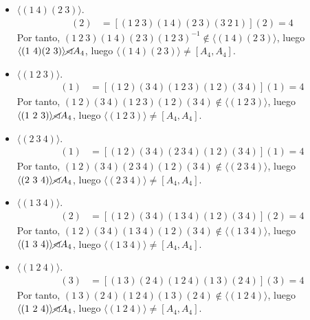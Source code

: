 \begin{ejercicio}
\begin{enumerate}
\begin{enumerate}
\begin{itemize}
                \item $\langle (1\ 4)(2\ 3)\rangle$.
                \begin{align*}
                    [(1\ 2\ 3)(1\ 4)(2\ 3)(1\ 2\ 3)^{-1}](2) &= [(1\ 2\ 3)(1\ 4)(2\ 3)(3\ 2\ 1)](2) = 4
                \end{align*}
                Por tanto, $(1\ 2\ 3)(1\ 4)(2\ 3)(1\ 2\ 3)^{-1}\notin \langle (1\ 4)(2\ 3)\rangle$, luego $\langle (1\ 4)(2\ 3)\rangle \cancel{\lhd} A_4$, luego $\langle (1\ 4)(2\ 3)\rangle \neq [A_4,A_4]$.

                \item $\langle (1\ 2\ 3)\rangle$.
                \begin{align*}
                    [(1\ 2)(3\ 4)(1\ 2\ 3)(1\ 2)^{-1}(3\ 4)^{-1}](1) &= [(1\ 2)(3\ 4)(1\ 2\ 3)(1\ 2)(3\ 4)](1) = 4
                \end{align*}
                Por tanto, $(1\ 2)(3\ 4)(1\ 2\ 3)(1\ 2)(3\ 4)\notin \langle (1\ 2\ 3)\rangle$, luego $\langle (1\ 2\ 3)\rangle \cancel{\lhd} A_4$, luego $\langle (1\ 2\ 3)\rangle \neq [A_4,A_4]$.

                \item $\langle (2\ 3\ 4)\rangle$.
                \begin{align*}
                    [(1\ 2)(3\ 4)(2\ 3\ 4)(1\ 2)^{-1}(3\ 4)^{-1}](1) &= [(1\ 2)(3\ 4)(2\ 3\ 4)(1\ 2)(3\ 4)](1) = 4
                \end{align*}
                Por tanto, $(1\ 2)(3\ 4)(2\ 3\ 4)(1\ 2)(3\ 4)\notin \langle (2\ 3\ 4)\rangle$, luego $\langle (2\ 3\ 4)\rangle \cancel{\lhd} A_4$, luego $\langle (2\ 3\ 4)\rangle \neq [A_4,A_4]$.

                \item $\langle (1\ 3\ 4)\rangle$.
                \begin{align*}
                    [(1\ 2)(3\ 4)(1\ 3\ 4)(1\ 2)^{-1}(3\ 4)^{-1}](2) &= [(1\ 2)(3\ 4)(1\ 3\ 4)(1\ 2)(3\ 4)](2) = 4
                \end{align*}
                Por tanto, $(1\ 2)(3\ 4)(1\ 3\ 4)(1\ 2)(3\ 4)\notin \langle (1\ 3\ 4)\rangle$, luego $\langle (1\ 3\ 4)\rangle \cancel{\lhd} A_4$, luego $\langle (1\ 3\ 4)\rangle \neq [A_4,A_4]$.

                \item $\langle (1\ 2\ 4)\rangle$.
                \begin{align*}
                    [(1\ 3)(2\ 4)(1\ 2\ 4)(1\ 3)^{-1}(2\ 4)^{-1}](3) &= [(1\ 3)(2\ 4)(1\ 2\ 4)(1\ 3)(2\ 4)](3) = 4
                \end{align*}
                Por tanto, $(1\ 3)(2\ 4)(1\ 2\ 4)(1\ 3)(2\ 4)\notin \langle (1\ 2\ 4)\rangle$, luego $\langle (1\ 2\ 4)\rangle \cancel{\lhd} A_4$, luego $\langle (1\ 2\ 4)\rangle \neq [A_4,A_4]$.


\end{itemize}
\end{enumerate}
\end{enumerate}
\end{ejercicio}
